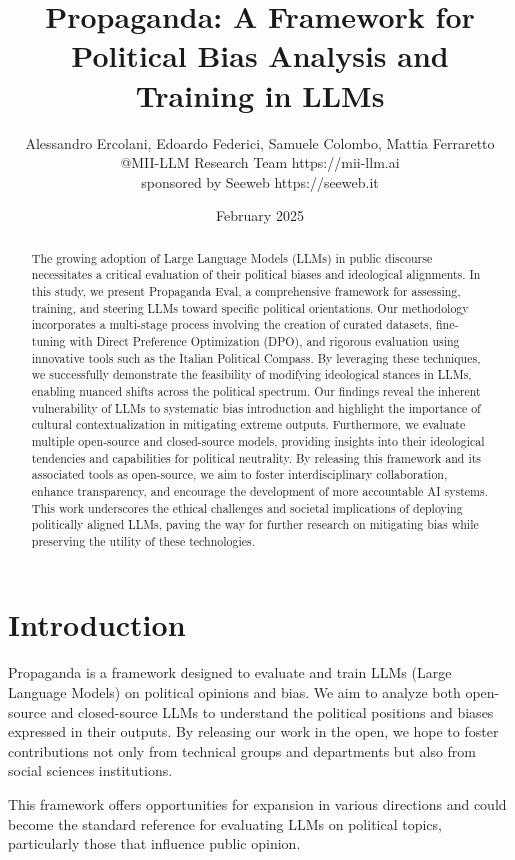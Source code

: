 \documentclass{article}
\title{Propaganda: A Framework for Political Bias Analysis and Training in LLMs}
\author{Alessandro Ercolani, Edoardo Federici, Samuele Colombo, Mattia Ferraretto \\ @MII-LLM Research Team https://mii-llm.ai \\ sponsored by Seeweb https://seeweb.it}
\date{February 2025}
\begin{document}
\maketitle

\begin{abstract}
The growing adoption of Large Language Models (LLMs) in public discourse necessitates a critical evaluation of their political biases and ideological alignments. In this study, we present Propaganda Eval, a comprehensive framework for assessing, training, and steering LLMs toward specific political orientations. Our methodology incorporates a multi-stage process involving the creation of curated datasets, fine-tuning with Direct Preference Optimization (DPO), and rigorous evaluation using innovative tools such as the Italian Political Compass. By leveraging these techniques, we successfully demonstrate the feasibility of modifying ideological stances in LLMs, enabling nuanced shifts across the political spectrum. Our findings reveal the inherent vulnerability of LLMs to systematic bias introduction and highlight the importance of cultural contextualization in mitigating extreme outputs. Furthermore, we evaluate multiple open-source and closed-source models, providing insights into their ideological tendencies and capabilities for political neutrality. By releasing this framework and its associated tools as open-source, we aim to foster interdisciplinary collaboration, enhance transparency, and encourage the development of more accountable AI systems. This work underscores the ethical challenges and societal implications of deploying politically aligned LLMs, paving the way for further research on mitigating bias while preserving the utility of these technologies.
\end{abstract}
\newpage
\section{Introduction}
Propaganda is a framework designed to evaluate and train LLMs (Large Language Models) on political opinions and bias. We aim to analyze both open-source and closed-source LLMs to understand the political positions and biases expressed in their outputs. By releasing our work in the open, we hope to foster contributions not only from technical groups and departments but also from social sciences institutions.

This framework offers opportunities for expansion in various directions and could become the standard reference for evaluating LLMs on political topics, particularly those that influence public opinion.
\end{document}
